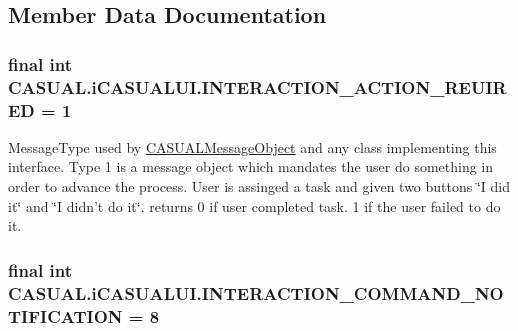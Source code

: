\subsection{Member Data Documentation}
\hypertarget{interface_c_a_s_u_a_l_1_1i_c_a_s_u_a_l_u_i_aca28dc5825bdf86f02fbed58dca9a7a4}{
\subsubsection[{I\-N\-T\-E\-R\-A\-C\-T\-I\-O\-N\-\_\-\-A\-C\-T\-I\-O\-N\-\_\-\-R\-E\-U\-I\-R\-E\-D}]{\setlength{\rightskip}{0pt plus 5cm}final int C\-A\-S\-U\-A\-L.\-i\-C\-A\-S\-U\-A\-L\-U\-I.\-I\-N\-T\-E\-R\-A\-C\-T\-I\-O\-N\-\_\-\-A\-C\-T\-I\-O\-N\-\_\-\-R\-E\-U\-I\-R\-E\-D = 1}}\label{interface_c_a_s_u_a_l_1_1i_c_a_s_u_a_l_u_i_aca28dc5825bdf86f02fbed58dca9a7a4}
Message\-Type used by \hyperlink{class_c_a_s_u_a_l_1_1_c_a_s_u_a_l_message_object}{C\-A\-S\-U\-A\-L\-Message\-Object} and any class implementing this interface. Type 1 is a message object which mandates the user do something in order to advance the process. User is assinged a task and given two buttons \char`\"{}\-I did it\char`\"{} and \char`\"{}\-I didn't do it\char`\"{}. returns 0 if user completed task. 1 if the user failed to do it. \hypertarget{interface_c_a_s_u_a_l_1_1i_c_a_s_u_a_l_u_i_a1344b8156e454e8861b736538aaa6b99}{
\subsubsection[{I\-N\-T\-E\-R\-A\-C\-T\-I\-O\-N\-\_\-\-C\-O\-M\-M\-A\-N\-D\-\_\-\-N\-O\-T\-I\-F\-I\-C\-A\-T\-I\-O\-N}]{\setlength{\rightskip}{0pt plus 5cm}final int C\-A\-S\-U\-A\-L.\-i\-C\-A\-S\-U\-A\-L\-U\-I.\-I\-N\-T\-E\-R\-A\-C\-T\-I\-O\-N\-\_\-\-C\-O\-M\-M\-A\-N\-D\-\_\-\-N\-O\-T\-I\-F\-I\-C\-A\-T\-I\-O\-N = 8}}\label{interface_c_a_s_u_a_l_1_1i_c_a_s_u_a_l_u_i_a1344b8156e454e8861b736538aaa6b99}
